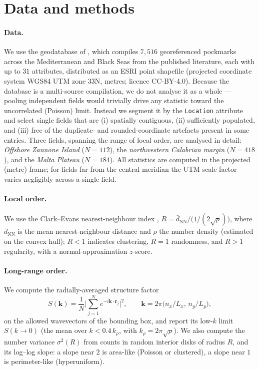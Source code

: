 \documentclass[11pt]{article}
\begin{document}
\section{Data and methods}

\paragraph{Data.} We use the geodatabase of \citet{spatola2025}, which compiles
$7{,}516$ georeferenced pockmarks across the Mediterranean and Black Seas from
the published literature, each with up to $31$ attributes, distributed as an
ESRI point shapefile (projected coordinate system WGS84 UTM zone 33N, metres;
licence CC-BY-4.0). Because the database is a multi-source compilation, we do not
analyse it as a whole --- pooling independent fields would trivially drive any
statistic toward the uncorrelated (Poisson) limit. Instead we segment it by the
\texttt{Location} attribute and select single fields that are (i) spatially
contiguous, (ii) sufficiently populated, and (iii) free of the duplicate- and
rounded-coordinate artefacts present in some entries. Three fields, spanning the
range of local order, are analysed in detail: \emph{Offshore Zannone Island}
($N=112$), the \emph{northwestern Calabrian margin} ($N=418$), and the
\emph{Malta Plateau} ($N=184$). All statistics are computed in the projected
(metre) frame; for fields far from the central meridian the UTM scale factor
varies negligibly across a single field.

\paragraph{Local order.} We use the Clark--Evans nearest-neighbour index
\citep{clark1954}, $R=\bar d_{\mathrm{NN}}/\big(1/(2\sqrt{\rho})\big)$, where
$\bar d_{\mathrm{NN}}$ is the mean nearest-neighbour distance and $\rho$ the
number density (estimated on the convex hull); $R<1$ indicates clustering, $R=1$
randomness, and $R>1$ regularity, with a normal-approximation $z$-score.

\paragraph{Long-range order.} We compute the radially-averaged structure factor
\begin{equation}
S(\mathbf{k})=\frac1N\Big|\sum_{j=1}^{N}e^{-i\mathbf{k}\cdot\mathbf{r}_j}\Big|^2,
\qquad \mathbf{k}=2\pi\big(n_x/L_x,\,n_y/L_y\big),
\label{eq:sk}
\end{equation}
on the allowed wavevectors of the bounding box, and report its low-$k$ limit
$S(k\!\to\!0)$ (the mean over $k<0.4\,k_\rho$, with $k_\rho=2\pi\sqrt{\rho}$). We
also compute the number variance $\sigma^2(R)$ from counts in random interior
disks of radius $R$, and its log--log slope: a slope near $2$ is area-like
(Poisson or clustered), a slope near $1$ is perimeter-like (hyperuniform).
\end{document}
